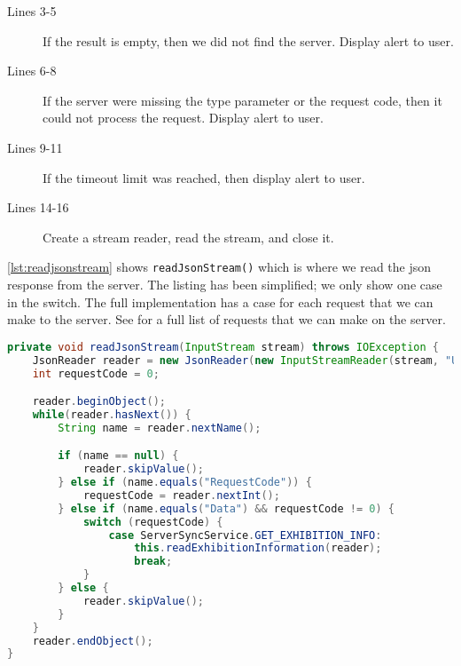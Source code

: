\begin{description}
\item[Lines 3-5] If the result is empty, then we did not find the server. Display alert to user.
\item[Lines 6-8] If the server were missing the type parameter or the request code, then it could not process the request. Display alert to user.
\item[Lines 9-11] If the timeout limit was reached, then display alert to user. 
\item[Lines 14-16] Create a stream reader, read the stream, and close it.
\end{description}
\autoref{lst:readjsonstream} shows \lstinline|readJsonStream()| which is where we read the \ac{json} response from the server. The listing has been simplified; we only show one case in the switch. The full implementation has a case for each request that we can make to the server. See  for a full list of requests that we can make on the server.

\begin{lstlisting}[language=java, label=lst:readjsonstream, caption={The method \lstinline|readJsonStream()|}]
private void readJsonStream(InputStream stream) throws IOException {
    JsonReader reader = new JsonReader(new InputStreamReader(stream, "UTF-8"));
    int requestCode = 0;

    reader.beginObject();
    while(reader.hasNext()) {
        String name = reader.nextName();

        if (name == null) {
            reader.skipValue();
        } else if (name.equals("RequestCode")) {
            requestCode = reader.nextInt();
        } else if (name.equals("Data") && requestCode != 0) {
            switch (requestCode) {
                case ServerSyncService.GET_EXHIBITION_INFO:
                    this.readExhibitionInformation(reader);
                    break;
            }
        } else {
            reader.skipValue();
        }
    }
    reader.endObject();
}
\end{lstlisting}

